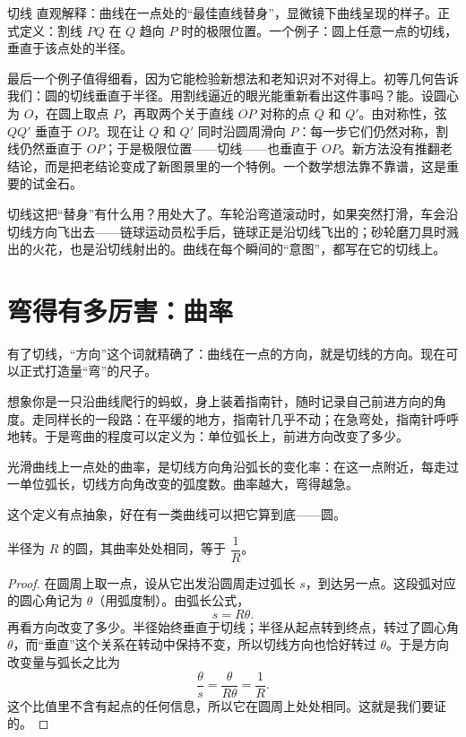 \begin{shuyu}{切线}
直观解释：曲线在一点处的``最佳直线替身''，显微镜下曲线呈现的样子。正式定义：割线 $PQ$ 在 $Q$ 趋向 $P$ 时的极限位置。一个例子：圆上任意一点的切线，垂直于该点处的半径。
\end{shuyu}

最后一个例子值得细看，因为它能检验新想法和老知识对不对得上。初等几何告诉我们：圆的切线垂直于半径。用割线逼近的眼光能重新看出这件事吗？能。设圆心为 $O$，在圆上取点 $P$，再取两个关于直线 $OP$ 对称的点 $Q$ 和 $Q'$。由对称性，弦 $QQ'$ 垂直于 $OP$。现在让 $Q$ 和 $Q'$ 同时沿圆周滑向 $P$：每一步它们仍然对称，割线仍然垂直于 $OP$；于是极限位置——切线——也垂直于 $OP$。新方法没有推翻老结论，而是把老结论变成了新图景里的一个特例。一个数学想法靠不靠谱，这是重要的试金石。

切线这把``替身''有什么用？用处大了。车轮沿弯道滚动时，如果突然打滑，车会沿切线方向飞出去——链球运动员松手后，链球正是沿切线飞出的；砂轮磨刀具时溅出的火花，也是沿切线射出的。曲线在每个瞬间的``意图''，都写在它的切线上。

\section{弯得有多厉害：曲率}

有了切线，``方向''这个词就精确了：曲线在一点的方向，就是切线的方向。现在可以正式打造量``弯''的尺子。

想象你是一只沿曲线爬行的蚂蚁，身上装着指南针，随时记录自己前进方向的角度。走同样长的一段路：在平缓的地方，指南针几乎不动；在急弯处，指南针呼呼地转。于是弯曲的程度可以定义为：单位弧长上，前进方向改变了多少。

\begin{dingyi}[曲率的初步定义]
光滑曲线上一点处的曲率，是切线方向角沿弧长的变化率：在这一点附近，每走过一单位弧长，切线方向角改变的弧度数。曲率越大，弯得越急。
\end{dingyi}

这个定义有点抽象，好在有一类曲线可以把它算到底——圆。

\begin{dingli}[圆的曲率]
半径为 $R$ 的圆，其曲率处处相同，等于 $\dfrac{1}{R}$。
\end{dingli}

\begin{proof}
在圆周上取一点，设从它出发沿圆周走过弧长 $s$，到达另一点。这段弧对应的圆心角记为 $\theta$（用弧度制）。由弧长公式，
\[
s = R\theta.
\]
再看方向改变了多少。半径始终垂直于切线；半径从起点转到终点，转过了圆心角 $\theta$，而``垂直''这个关系在转动中保持不变，所以切线方向也恰好转过 $\theta$。于是方向改变量与弧长之比为
\[
\frac{\theta}{s} = \frac{\theta}{R\theta} = \frac{1}{R}.
\]
这个比值里不含有起点的任何信息，所以它在圆周上处处相同。这就是我们要证的。
\end{proof}

